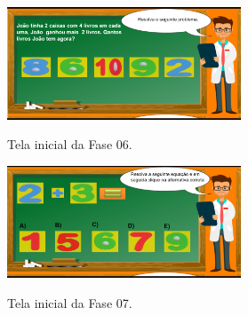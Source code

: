 \documentclass[
	12pt,				%
    oneside,			%
	a4paper,			%
	english,			%
	french,				%
	spanish,			%
	brazil,				%
	]{abntex2}
\begin{document}
\begin{figure} [h] 


\caption{Tela inicial da Fase 06.}

\includegraphics[width=0.62\textwidth]{jogo06.png} %
\centering
\\
\label{jogo06} 
\end{figure}

\begin{figure} [ht] 


\caption{Tela inicial da Fase 07.}

\includegraphics[width=0.62\textwidth]{jogo07.png} %
\centering
\\
\label{jogo07} 
\end{figure}
\end{document}
